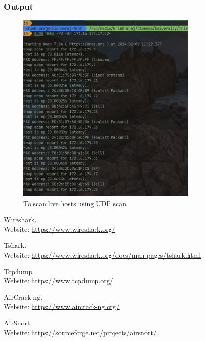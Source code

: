 \documentclass[11pt]{article}
\begin{document}
\subsubsection*{Output}
\begin{figure}[H]
    \centering
    \includegraphics[width=0.8\textwidth]{udp scan.png}
    \caption{To scan live hosts using UDP scan.}
    \label{fig:1}
\end{figure}


\clearpage
\begin{thebibliography}{99}
	Wireshark. \\
	Website: \url{https://www.wireshark.org/}

	Tshark. \\
	Website: \url{https://www.wireshark.org/docs/man-pages/tshark.html}

	Tcpdump. \\
	Website: \url{https://www.tcpdump.org/}

	AirCrack-ng. \\
	Website: \url{https://www.aircrack-ng.org/}

	AirSnort. \\
	Website: \url{https://sourceforge.net/projects/airsnort/}
\end{thebibliography}
\end{document}
